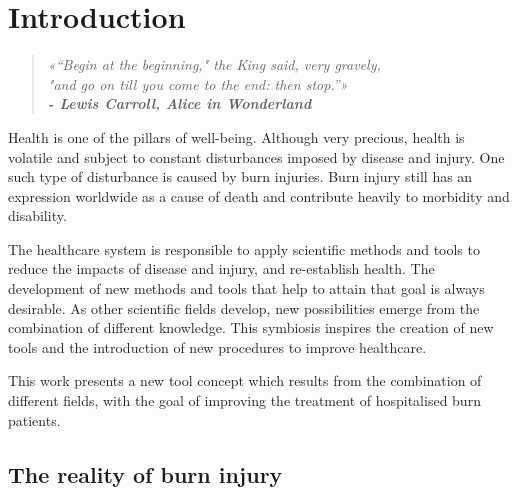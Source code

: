 \newcommand{\novathesis}{\emph{novathesis}}
\newcommand{\novathesisclass}{\texttt{novathesis.cls}}


\chapter{Introduction}
\label{cha:introduction}

\begin{quotation}
\begin{flushright}
\itshape
«“Begin at the beginning," the King said, very gravely, \\"and go on till you come to the end: then stop.”»\\
\textbf{- Lewis Carroll, Alice in Wonderland}
\end{flushright}
\end{quotation}

Health is one of the pillars of well-being. Although very precious, health is volatile and subject to constant disturbances imposed by disease and injury. One such type of disturbance is caused by burn injuries. Burn injury still has an expression worldwide as a cause of death and contribute heavily to morbidity and disability.

The healthcare system is responsible to apply scientific methods and tools to reduce the impacts of disease and injury, and re-establish health. The development of new methods and tools that help to attain that goal is always desirable. As other scientific fields develop, new possibilities emerge from the combination of different knowledge. This symbiosis inspires the creation of new tools and the introduction of new procedures to improve healthcare.

This work presents a new tool concept which results from the combination of different fields, with the goal of improving the treatment of hospitalised burn patients.

\section{The reality of burn injury} %
\label{sec:the_reality_of_burn_injury}

